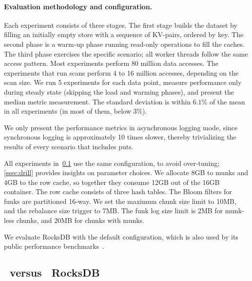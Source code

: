 \paragraph{Evaluation methodology and configuration.} Each experiment consists of three stages. The first stage builds 
the dataset by filling an initially empty store with a sequence of KV-pairs, ordered by key. The second phase is a warm-up phase running read-only operations to fill the caches. The third
phase exercises the specific scenario; all worker threads follow the same access pattern. Most experiments 
perform 80 million data accesses. The experiments that run scans perform 4 to 16 million accesses, depending 
on the scan size. We run 5 experiments for each data point, measure performance only during steady state (skipping the 
load and warming phases), and present the median metric measurement. The standard deviation is within $6.1\%$ 
of the mean in all experiments (in most of them, below $3\%$). 

We only present the performance metrics in asynchronous logging mode, since synchronous logging 
is approximately 10 times slower, thereby trivializing the results of every scenario that includes puts. 

All experiments in~\cref{ssec:results} use the same \sys\/ configuration, to avoid 
over-tuning; \cref{ssec:drill} provides insights on parameter choices.
We allocate 8GB to munks and 4GB to the row cache,
so together they consume 12GB out of the 16GB container. 
The row cache consists of three hash tables.  
The Bloom filters for funks are partitioned 16-way.  
We set the \sys\/ maximum chunk size limit to 10MB, and the rebalance size trigger to 7MB. 
The funk log size limit is 2MB for munk-less chunks, and 20MB for chunks with munks. 

We evaluate RocksDB with the default configuration, which is also used by its public performance benchmarks~\cite{RocksDBPerf}.

\subsection{\sys\ versus \ RocksDB}
\label{ssec:results} 


